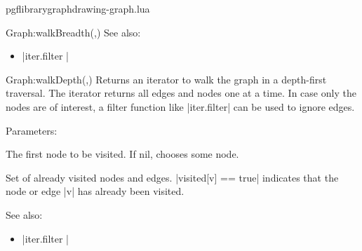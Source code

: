 \begin{filedescription}{pgflibrarygraphdrawing-graph.lua}
\begin{luacommand}{{Graph:walkBreadth}(,)}
See also:
\begin{itemize}
	\item[] |iter.filter |
\end{itemize}

\end{luacommand}\begin{luacommand}{{Graph:walkDepth}(,)}
Returns an iterator to walk the graph in a depth-first traversal.  The iterator returns all edges and nodes one at a time. In case only the nodes are of interest, a filter function like |iter.filter| can be used to ignore edges. 

Parameters:
\begin{parameterdescription}
	\item[\meta{root}] The first node to be visited.  If nil, chooses some node.\item[\meta{visited}] Set of already visited nodes and edges. |visited[v] == true| indicates that the node or edge |v| has already been visited. 
\end{parameterdescription}



See also:
\begin{itemize}
	\item[] |iter.filter |
\end{itemize}

\end{luacommand}
\end{filedescription}